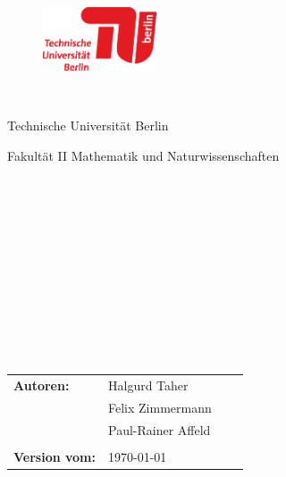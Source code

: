 


%


\thispagestyle{empty}

\begin{figure}[t]

 \includegraphics[width=0.3\textwidth]{abb/misc/TULogo.eps}
~~~~~~~~~~
\end{figure}


\begin{verbatim}


\end{verbatim}

\begin{center}
\Large{Technische Universit\"at Berlin}\\
\end{center}


\begin{center}
\Large{Fakult\"at II Mathematik und Naturwissenschaften}
\end{center}
\begin{verbatim}


\end{verbatim}
\begin{center}
\doublespacing
\textbf{\LARGE{\titleDocument}}\\
\singlespacing
\begin{verbatim}

\end{verbatim}
\textbf{{~\subjectDocument}}
\end{center}
\begin{verbatim}

\end{verbatim}
\begin{center}

\end{center}
\begin{verbatim}





\end{verbatim}
\begin{flushleft}
\begin{tabular}{llll}
\textbf{Autoren:} &  Halgurd Taher &\\& Felix Zimmermann& \\
&  Paul-Rainer Affeld & \\
& & \\
\textbf{Version vom:}  & \today &
\end{tabular}
\end{flushleft}